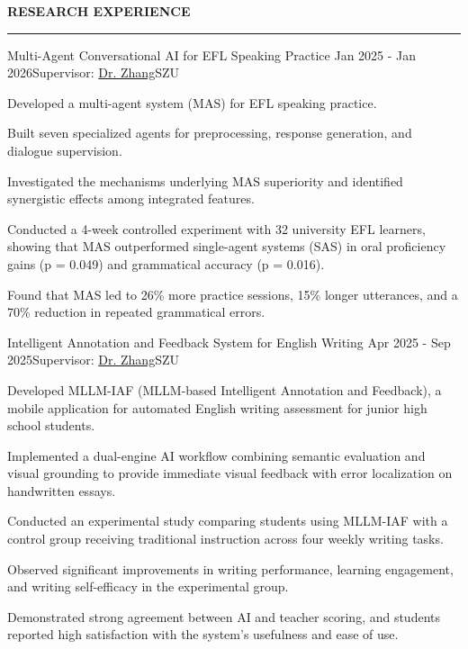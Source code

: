 \documentclass{resume} %
\renewenvironment{rSection}[1]{
  \sectionskip
  \textbf{\MakeUppercase{#1}}
  \sectionlineskip
  \hrule
  \begin{list}{}{
  \setlength{\leftmargin}{1.5em}
  }
  \item[]
  }{
  \end{list}
  }
\begin{document}
  \begin{rSection}{Research Experience}

  \begin{rSubsection}{Multi-Agent Conversational AI for EFL Speaking Practice \cite{paper1}}{Jan
  2025 - Jan 2026}{Supervisor: \href{https://fe.szu.edu.cn/info/1023/1133.htm}{Dr. Zhang}}{SZU}
  \item Developed a multi-agent system (MAS) for EFL speaking practice.
  \item Built seven specialized agents for preprocessing, response generation, and dialogue
  supervision.
  \item Investigated the mechanisms underlying MAS superiority and identified synergistic effects
  among integrated features.
  \item Conducted a 4-week controlled experiment with 32 university EFL learners, showing that MAS
  outperformed single-agent systems (SAS) in oral proficiency gains (p = 0.049) and grammatical
  accuracy (p = 0.016).
  \item Found that MAS led to 26\% more practice sessions, 15\% longer utterances, and a 70\%
  reduction in repeated grammatical errors.
  \end{rSubsection}

  \begin{rSubsection}{Intelligent Annotation and Feedback System for English Writing \cite{paper4}}
  {Apr 2025 - Sep 2025}{Supervisor: \href{https://fe.szu.edu.cn/info/1023/1133.htm}{Dr. Zhang}}{SZU}
  \item Developed MLLM-IAF (MLLM-based Intelligent Annotation and Feedback), a mobile
  application for automated English writing assessment for junior high school students.
  \item Implemented a dual-engine AI workflow combining semantic evaluation and visual grounding to
  provide immediate visual feedback with error localization on handwritten essays.
  \item Conducted an experimental study comparing students using MLLM-IAF with a control group
  receiving traditional instruction across four weekly writing tasks.
  \item Observed significant improvements in writing performance, learning engagement, and writing
  self-efficacy in the experimental group.
  \item Demonstrated strong agreement between AI and teacher scoring, and students reported high
  satisfaction with the system's usefulness and ease of use.
  \end{rSubsection}

  \end{rSection}
\end{document}
